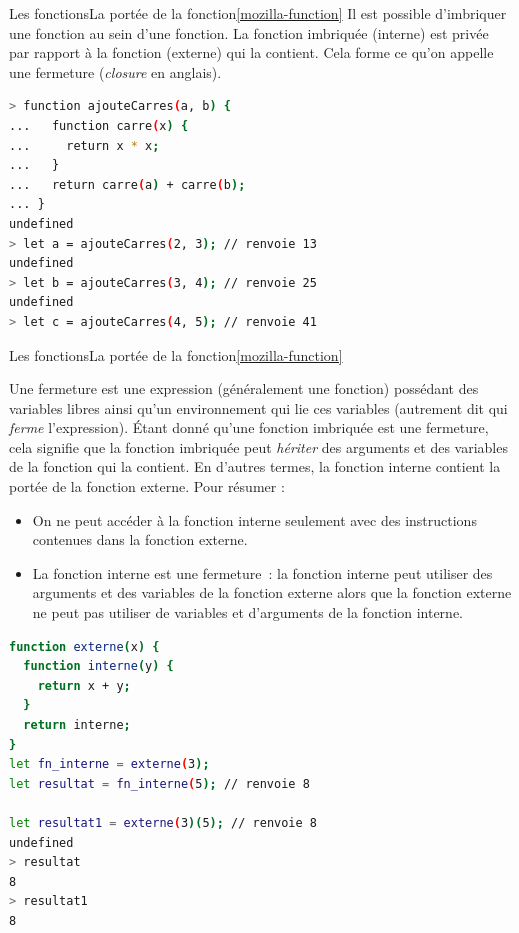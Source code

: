 \documentclass{beamer}
\begin{document}
    \begin{frame}[fragile]{Les fonctions}{La portée de la fonction\cref{mozilla-function}}
        Il est possible d'imbriquer une fonction au sein d'une fonction.
        La fonction imbriquée (interne) est privée par rapport à la fonction (externe) qui la contient. Cela forme ce qu'on appelle une fermeture (\textit{closure} en anglais).
        \begin{lstlisting}[language=Bash]
> function ajouteCarres(a, b) {
...   function carre(x) {
...     return x * x;
...   }
...   return carre(a) + carre(b);
... }
undefined
> let a = ajouteCarres(2, 3); // renvoie 13
undefined
> let b = ajouteCarres(3, 4); // renvoie 25
undefined
> let c = ajouteCarres(4, 5); // renvoie 41
        \end{lstlisting}
    \end{frame}

    \begin{frame}[fragile]{Les fonctions}{La portée de la fonction\cref{mozilla-function}}
        \begin{tiny}
            Une fermeture est une expression (généralement une fonction) possédant des variables libres ainsi qu'un environnement qui lie ces variables (autrement dit qui \textit{ferme} l'expression).
            \bigbreak
            Étant donné qu'une fonction imbriquée est une fermeture, cela signifie que la fonction imbriquée peut \textit{hériter} des arguments et des variables de la fonction qui la contient.
            En d'autres termes, la fonction interne contient la portée de la fonction externe.
            \bigbreak
            Pour résumer :
            \begin{itemize}
                \item On ne peut accéder à la fonction interne seulement avec des instructions contenues dans la fonction externe.
                \item La fonction interne est une fermeture~: la fonction interne peut utiliser des arguments et des variables de la fonction externe alors que la fonction externe ne peut pas utiliser de variables et d'arguments de la fonction interne.
            \end{itemize}
        \end{tiny}
        \begin{lstlisting}[language=Bash,basicstyle=\tiny\ttfamily]
function externe(x) {
  function interne(y) {
    return x + y;
  }
  return interne;
}
let fn_interne = externe(3);
let resultat = fn_interne(5); // renvoie 8

let resultat1 = externe(3)(5); // renvoie 8
undefined
> resultat
8
> resultat1
8
        \end{lstlisting}
    \end{frame}
\end{document}
